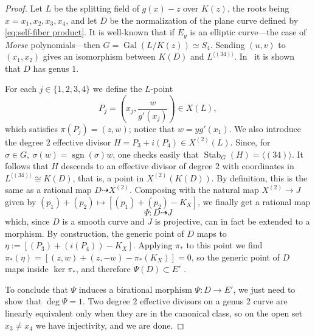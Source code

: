 \documentclass[a4paper,twoside,english]{amsart}
\theoremstyle{plain}
\theoremstyle{definition}
\begin{document}
\begin{proof}
Let $L$ be the splitting field of $g(x)-z$ over $K(z)$, the roots being $x=x_1,x_2,x_3,x_4$, and let $D$ be the normalization of the plane curve defined by \eqref{eq:self-fiber product}. It is well-known \cite[\S 4.4]{Serre1992} that if $E_g$ is an elliptic curve---the case of \textit{Morse} polynomials---then $G=\operatorname{Gal}(L/K(z))\simeq S_4$. Sending $(u,v)$ to $(x_1,x_2)$ gives an isomorphism between $K(D)$ and $L^{\langle(34)\rangle}$.
In~\cite[\S 4.1]{nac2} it is shown that $D$ has genus $1$. 

For each $j\in\{1,2,3,4\}$ we define the $L$-point
\[
P_j=\left(x_j,\frac{w}{g'(x_j)}\right)\in X(L),
\]
which satisfies $\pi(P_j) = (z, w)$; notice that $w = yg'(x_1)$. We also introduce
the degree $2$ effective divisor $H=P_3+i(P_4)\in X^{(2)}(L)$. Since, for $\sigma\in G, \ \sigma(w)=\operatorname{sgn}(\sigma)w$, one checks easily that $\operatorname{Stab}_G(H)=\langle(34)\rangle$. It follows that $H$ descends to an effective divisor of degree $2$ with coordinates in $L^{\langle (34)\rangle} \cong K(D)$, that is, a point in $X^{(2)}(K(D))$. By definition, this is the same as a rational map $D \dashrightarrow X^{(2)}$. Composing with the natural map $X^{(2)} \to J$ given by $(p_1)+(p_2) \mapsto [(p_1)+(p_2) - K_X]$, we finally get a rational map 
\[
\Psi : D \dashrightarrow J
\] which, since $D$ is a smooth curve and $J$ is projective, can in fact be extended to a morphism. By construction, the generic point of $D$ maps to $\eta := [(P_3) + (i(P_4)) - K_X]$. Applying $\pi_*$ to this point we find $\pi_*(\eta) = [(z,w) + (z,-w) - \pi_*(K_X)]=0$, so the generic point of $D$ maps inside $\ker \pi_*$, and therefore $\Psi(D) \subset E'$ .

To conclude that $\Psi$ induces a birational morphism $\Psi: D \to E'$, we just need to show that $\deg\Psi=1$. Two degree $2$ effective divisors on a genus $2$ curve are linearly equivalent only when they are in the canonical class, so on the open set $x_3\neq x_4$ we have injectivity, and we are done.
\end{proof}
\end{document}
